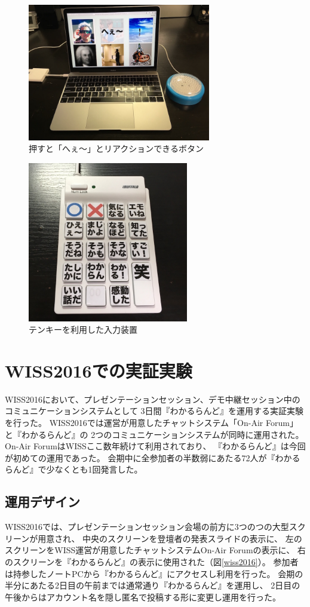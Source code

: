 \begin{figure}[h]
\centering
\includegraphics[width=8cm]{images/heebutton.png}
\caption{押すと「へぇ〜」とリアクションできるボタン}
\label{heebutton}
\end{figure}

\begin{figure}[h]
\centering
\includegraphics[width=7cm]{images/10key.png}
\caption{テンキーを利用した入力装置}
\label{10key}
\end{figure}

\clearpage


\section{WISS2016での実証実験}
WISS2016において、プレゼンテーションセッション、デモ中継セッション中のコミュニケーションシステムとして
3日間『わかるらんど』を運用する実証実験を行った。
WISS2016では運営が用意したチャットシステム「On-Air Forum」と『わかるらんど』の
2つのコミュニケーションシステムが同時に運用された。
On-Air ForumはWISSここ数年続けて利用されており、
『わかるらんど』は今回が初めての運用であった。
会期中に全参加者の半数弱にあたる72人が『わかるらんど』で少なくとも1回発言した。

\subsection{運用デザイン}
WISS2016では、プレゼンテーションセッション会場の前方に3つのつの大型スクリーンが用意され、
中央のスクリーンを登壇者の発表スライドの表示に、
左のスクリーンをWISS運営が用意したチャットシステムOn-Air Forumの表示に、
右のスクリーンを『わかるらんど』の表示に使用された（図\ref{wiss2016}）。
参加者は持参したノートPCから『わかるらんど』にアクセスし利用を行った。
会期の半分にあたる2日目の午前までは通常通り『わかるらんど』を運用し、
2日目の午後からはアカウント名を隠し匿名で投稿する形に変更し運用を行った。

